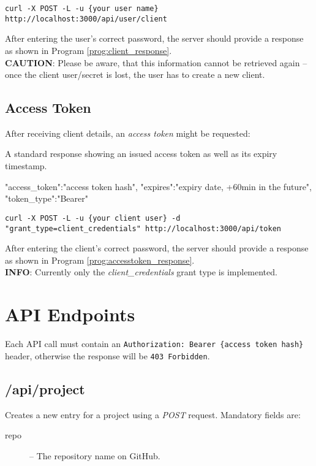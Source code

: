 \documentclass[a4paper,english,11pt]{report}
\begin{document}
\begin{center}
  \texttt{curl -X POST -L -u \{your user name\} http://localhost:3000/api/user/client}
\end{center}
After entering the user's correct password, the server should provide a response as shown in Program \ref{prog:client_response}.\\
\textbf{CAUTION}: Please be aware, that this information cannot be retrieved again -- once the client user/secret is lost, the user has to create a new client.

\section{Access Token}
After receiving client details, an \emph{access token} might be requested:

\begin{program}
  \caption{A standard response showing an issued access token as well as its expiry timestamp.}
  \label{prog:accesstoken_response}
  \begin{JsCode}
    {
      "access_token":"{access token hash}",
      "expires":"{expiry date, +60min in the future}",
      "token_type":"Bearer"
    }
  \end{JsCode}
\end{program}

\begin{center}
  \texttt{curl -X POST -L -u \{your client user\} -d "grant\_type=client\_credentials" http://localhost:3000/api/token}
\end{center}
After entering the client's correct password, the server should provide a response as shown in Program \ref{prog:accesstoken_response}.\\
\textbf{INFO}: Currently only the \emph{client\_credentials} grant type is implemented.


\chapter{API Endpoints}

Each API call must contain an \texttt{Authorization: Bearer \{access token hash\}} header, otherwise the response will be \texttt{403 Forbidden}.

\section{/api/project}
Creates a new entry for a project using a \emph{POST} request. Mandatory fields are:
\begin{description}
  \item[repo] -- The repository name on GitHub.
\end{description}
\end{document}
